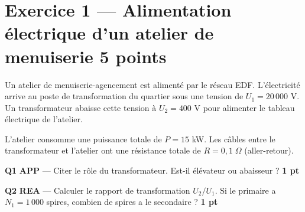\documentclass[a4paper,11pt]{article}
\newcommand{\pts}[1]{\hfill\textcolor{gris}{\small\textbf{#1}}}
\newcommand{\comp}[1]{\colorbox{blue!10}{\scriptsize\textbf{#1}}}
\begin{document}
\newpage

\section*{Exercice 1 — Alimentation électrique d'un atelier de menuiserie \pts{5 points}}

\begin{contextebox}
Un atelier de menuiserie-agencement est alimenté par le réseau EDF. L'électricité arrive au poste de transformation du quartier sous une tension de $U_1 = 20\,000$ V. Un transformateur abaisse cette tension à $U_2 = 400$ V pour alimenter le tableau électrique de l'atelier.

L'atelier consomme une puissance totale de $P = 15$ kW. Les câbles entre le transformateur et l'atelier ont une résistance totale de $R = 0{,}1\;\Omega$ (aller-retour).
\end{contextebox}

\begin{center}
\end{center}

\textbf{Q1} \comp{APP} — Citer le rôle du transformateur. Est-il élévateur ou abaisseur ? \pts{1 pt}

\begin{reponsebox}[2.5cm]
\end{reponsebox}

\textbf{Q2} \comp{REA} — Calculer le rapport de transformation $U_2/U_1$. Si le primaire a $N_1 = 1\,000$ spires, combien de spires a le secondaire ? \pts{1 pt}

\begin{reponsebox}[3cm]
\dotfill

\dotfill

\dotfill
\end{reponsebox}
\end{document}
